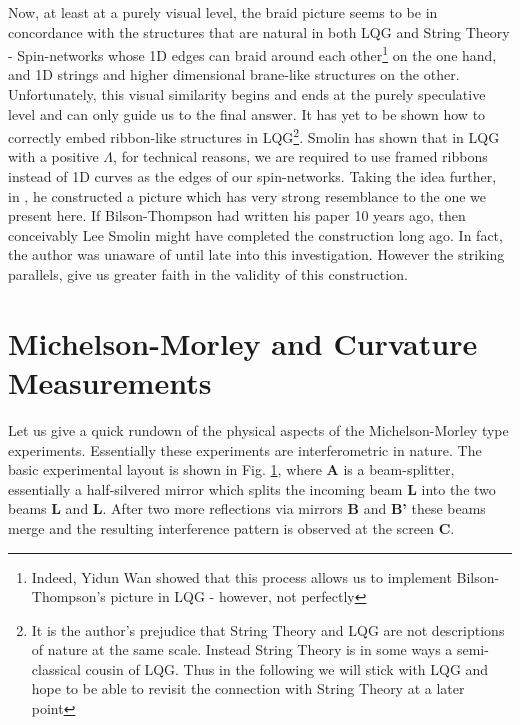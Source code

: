 \begin{doublespace}
Now, at least at a purely visual level, the braid picture seems to be in concordance with the structures that are natural in both LQG and String Theory - Spin-networks whose 1D edges can braid around each other\footnote{Indeed, Yidun Wan showed that this process allows us to implement Bilson-Thompson's picture in LQG - however, not perfectly} on the one hand, and 1D strings and higher dimensional brane-like structures on the other. Unfortunately, this visual similarity begins and ends at the purely speculative level and can only guide us to the final answer. It has yet to be shown how to correctly embed ribbon-like structures in LQG\footnote{It is the author's prejudice that String Theory and LQG are not descriptions of nature at the same scale. Instead String Theory is in some ways a semi-classical cousin of LQG. Thus in the following we will stick with LQG and hope to be able to revisit the connection with String Theory at a later point}. Smolin has shown \cite{Smolin2002Quantum} that in LQG with a positive $\Lambda$, for technical reasons, we are required to use framed ribbons instead of 1D curves as the edges of our spin-networks. Taking the idea further, in \cite{Smolin1995Linking}, he constructed a picture which has very strong resemblance to the one we present here. If Bilson-Thompson had written his paper 10 years ago, then conceivably Lee Smolin might have completed the construction long ago. In fact, the author was unaware of \cite{Smolin1995Linking} until late into this investigation. However the striking parallels, give us greater faith in the validity of this construction.

\section{Michelson-Morley and Curvature Measurements}\label{sec:MMExp}

Let us give a quick rundown of the physical aspects of the Michelson-Morley type experiments. Essentially these experiments are interferometric in nature. The basic experimental layout is shown in Fig. \ref{fig:mm-exp}, where \textbf{A} is a beam-splitter, essentially a half-silvered mirror which splits the incoming beam \textbf{L} into the two beams \textbf{L} and \textbf{L}. After two more reflections via mirrors \textbf{B} and \textbf{B'} these beams merge and the resulting interference pattern is observed at the screen \textbf{C}.

\begin{figure}[htbp]\label{fig:mm-exp}
\begin{center}
\end{center}
\end{figure}


\end{doublespace}

